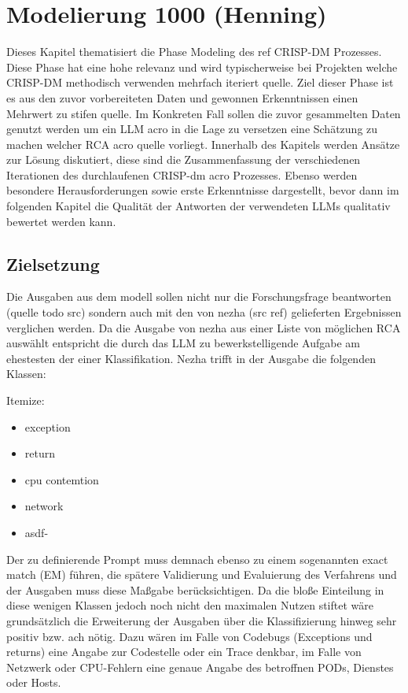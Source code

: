\chapter{Modelierung 1000 (Henning)}
\label{sec:Kapitel3}

Dieses Kapitel thematisiert die Phase Modeling des ref CRISP-DM Prozesses. Diese Phase hat eine hohe relevanz und wird typischerweise bei Projekten welche CRISP-DM methodisch verwenden mehrfach iteriert quelle. Ziel dieser Phase ist es aus den zuvor vorbereiteten Daten und gewonnen Erkenntnissen einen Mehrwert zu stifen quelle. Im Konkreten Fall sollen die zuvor gesammelten Daten genutzt werden um ein LLM acro in die Lage zu versetzen eine Schätzung zu machen welcher RCA acro quelle vorliegt. Innerhalb des Kapitels werden Ansätze zur Lösung diskutiert, diese sind die Zusammenfassung der verschiedenen Iterationen des durchlaufenen CRISP-dm acro Prozesses. Ebenso werden besondere Herausforderungen sowie erste Erkenntnisse dargestellt, bevor dann im folgenden Kapitel die Qualität der Antworten der verwendeten LLMs qualitativ bewertet werden kann. 

\section{Zielsetzung}
\label{sec:Zielsetzung}

Die Ausgaben aus dem modell sollen nicht nur die Forschungsfrage beantworten (quelle todo src) sondern auch mit den von nezha (src ref) gelieferten Ergebnissen verglichen werden. Da die Ausgabe von nezha aus einer Liste von möglichen RCA auswählt entspricht die durch das LLM zu bewerkstelligende Aufgabe am ehestesten der einer Klassifikation. Nezha trifft in der Ausgabe die folgenden Klassen:

Itemize:
\begin{itemize}
\item exception
\item return
\item cpu contemtion
\item network
\item asdf-
\end{itemize}

Der zu definierende Prompt muss demnach ebenso zu einem sogenannten exact match (EM) führen, die spätere Validierung und Evaluierung des Verfahrens und der Ausgaben muss diese Maßgabe berücksichtigen. Da die bloße Einteilung in diese wenigen Klassen jedoch noch nicht den maximalen Nutzen stiftet wäre grundsätzlich die Erweiterung der Ausgaben über die Klassifizierung hinweg sehr positiv bzw. ach nötig. Dazu wären im Falle von Codebugs (Exceptions und returns) eine Angabe zur Codestelle oder ein Trace denkbar, im Falle von Netzwerk oder CPU-Fehlern eine genaue Angabe des betroffnen PODs, Dienstes oder Hosts.

